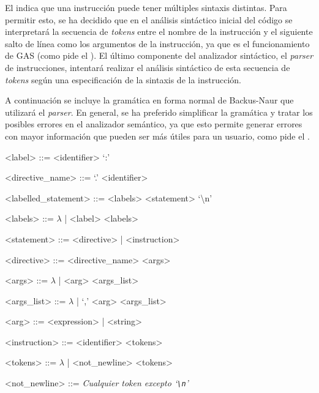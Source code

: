 El  indica que una instrucción puede tener
múltiples sintaxis distintas. Para permitir esto, se ha decidido que en el
análisis sintáctico inicial del código se interpretará la secuencia de
\textit{\glspl{token}} entre el nombre de la instrucción y el siguiente salto de
línea como los argumentos de la instrucción, ya que es el funcionamiento de
\gls{GAS} \parencite{as-manual} (como pide el ). El último
componente del analizador sintáctico, el \textit{\gls{parser}} de instrucciones,
intentará realizar el análisis sintáctico de esta secuencia de
\textit{\glspl{token}} según una especificación de la sintaxis de la
instrucción.

A continuación se incluye la gramática en forma normal de Backus-Naur
\parencite{BNF} que utilizará el \textit{\gls{parser}}. En general, se ha
preferido simplificar la gramática y tratar los posibles errores en el
analizador semántico, ya que esto permite generar errores con mayor información
que pueden ser más útiles para un usuario, como pide el
. %

\newcommand{\EOL}{\textbackslash{}n}
\newcommand{\verbEOL}{`\texttt{\textbackslash{}n}'}

\begin{tcolorbox}[enhanced jigsaw,breakable,top=4mm]
    \begin{grammar}
       <label> ::= <identifier> `:'

       <directive\_name> ::= `.' <identifier>

       <labelled\_statement> ::= <labels> <statement> `\EOL'

       <labels> ::= $\lambda$ | <label> <labels>

       <statement> ::= <directive> | <instruction>

       <directive> ::= <directive\_name> <args>

       <args> ::= $\lambda$ | <arg> <args\_list>

       <args\_list> ::= $\lambda$ | `,' <arg> <args\_list>

       <arg> ::= <expression> | <string>

       <instruction> ::= <identifier> <tokens>

       <tokens> ::= $\lambda$ | <not\_newline> <tokens>

       <not\_newline> ::= \textit{Cualquier token excepto \verbEOL}
    \end{grammar}
\end{tcolorbox}

